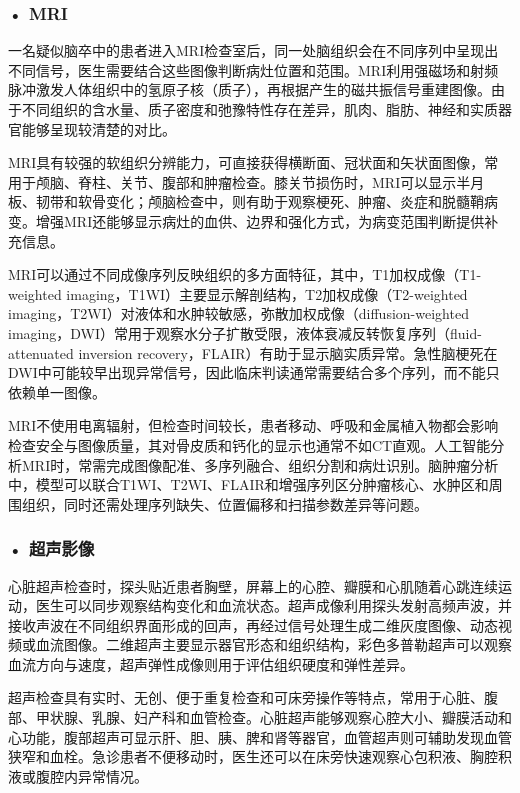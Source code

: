 \subsubsection*{\textbf{• MRI}}

一名疑似脑卒中的患者进入MRI检查室后，同一处脑组织会在不同序列中呈现出不同信号，医生需要结合这些图像判断病灶位置和范围。MRI利用强磁场和射频脉冲激发人体组织中的氢原子核（质子），再根据产生的磁共振信号重建图像。由于不同组织的含水量、质子密度和弛豫特性存在差异，肌肉、脂肪、神经和实质器官能够呈现较清楚的对比。

MRI具有较强的软组织分辨能力，可直接获得横断面、冠状面和矢状面图像，常用于颅脑、脊柱、关节、腹部和肿瘤检查。膝关节损伤时，MRI可以显示半月板、韧带和软骨变化；颅脑检查中，则有助于观察梗死、肿瘤、炎症和脱髓鞘病变。增强MRI还能够显示病灶的血供、边界和强化方式，为病变范围判断提供补充信息。

MRI可以通过不同成像序列反映组织的多方面特征，其中，T1加权成像（T1-weighted imaging，T1WI）主要显示解剖结构，T2加权成像（T2-weighted imaging，T2WI）对液体和水肿较敏感，弥散加权成像（diffusion-weighted imaging，DWI）常用于观察水分子扩散受限，液体衰减反转恢复序列（fluid-attenuated inversion recovery，FLAIR）有助于显示脑实质异常。急性脑梗死在DWI中可能较早出现异常信号，因此临床判读通常需要结合多个序列，而不能只依赖单一图像。

MRI不使用电离辐射，但检查时间较长，患者移动、呼吸和金属植入物都会影响检查安全与图像质量，其对骨皮质和钙化的显示也通常不如CT直观。人工智能分析MRI时，常需完成图像配准、多序列融合、组织分割和病灶识别。脑肿瘤分析中，模型可以联合T1WI、T2WI、FLAIR和增强序列区分肿瘤核心、水肿区和周围组织，同时还需处理序列缺失、位置偏移和扫描参数差异等问题。

\subsubsection*{\textbf{• 超声影像}}

心脏超声检查时，探头贴近患者胸壁，屏幕上的心腔、瓣膜和心肌随着心跳连续运动，医生可以同步观察结构变化和血流状态。超声成像利用探头发射高频声波，并接收声波在不同组织界面形成的回声，再经过信号处理生成二维灰度图像、动态视频或血流图像。二维超声主要显示器官形态和组织结构，彩色多普勒超声可以观察血流方向与速度，超声弹性成像则用于评估组织硬度和弹性差异。

超声检查具有实时、无创、便于重复检查和可床旁操作等特点，常用于心脏、腹部、甲状腺、乳腺、妇产科和血管检查。心脏超声能够观察心腔大小、瓣膜活动和心功能，腹部超声可显示肝、胆、胰、脾和肾等器官，血管超声则可辅助发现血管狭窄和血栓。急诊患者不便移动时，医生还可以在床旁快速观察心包积液、胸腔积液或腹腔内异常情况。

